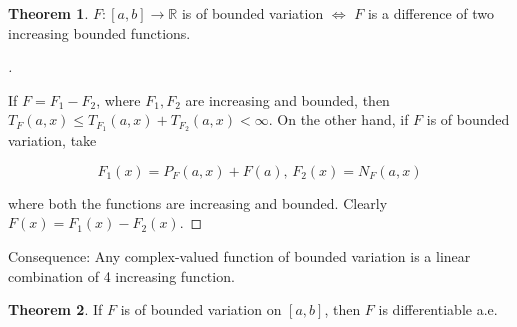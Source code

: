 \documentclass{article}
\theoremstyle{definition}
\newtheorem{thm}{Theorem}
\newenvironment{proofs}[1][\proofname]{%
  \begin{proof}[#1]$ $\par\nobreak\ignorespaces
}{%
  \end{proof}
}
\begin{document}
\begin{thm}
  $F:[a, b] \rightarrow \mathbb{R}$ is of bounded variation $\Leftrightarrow$ $F$ is a difference of two increasing bounded functions. 
\end{thm}

\begin{proofs}
  If $F = F_1 - F_2$, where $F_1, F_2$ are increasing and bounded, then $T_F(a, x) \leq T_{F_1}(a, x) + T_{F_2}(a ,x) < \infty$. On the other hand, if $F$ is of bounded variation, take 

  $$F_1(x) = P_F(a, x) + F(a) \text{, } F_2(x) = N_F(a, x)$$

  where both the functions are increasing and bounded. Clearly $F(x) = F_1(x) - F_2(x)$. 
\end{proofs}

Consequence: Any complex-valued function of bounded variation is a linear combination of 4 increasing function. 

\begin{thm}
  If $F$ is of bounded variation on $[a, b]$, then $F$ is differentiable a.e.
\end{thm}
\end{document}
